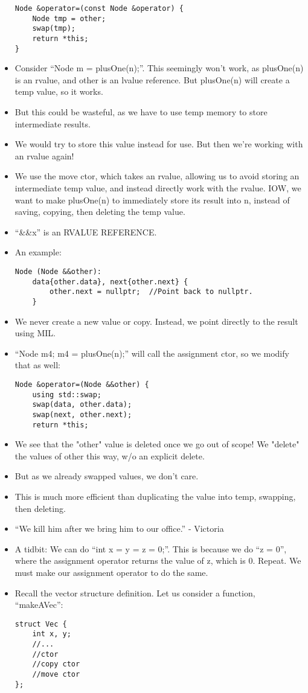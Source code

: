 \documentclass{article}
\begin{document}
\begin{itemize}
\begin{lstlisting}
Node &operator=(const Node &operator) {
    Node tmp = other;
    swap(tmp);
    return *this;
}
\end{lstlisting}
\item Consider ``Node m = plusOne(n);''.  This seemingly won't work, as plusOne(n) is an rvalue, and other is an lvalue reference.  But plusOne(n) will create a temp value, so it works.
\item But this could be wasteful, as we have to use temp memory to store intermediate results.
\item We would try to store this value instead for use.  But then we're working with an rvalue again!
\item We use the move ctor, which takes an rvalue, allowing us to avoid storing an intermediate temp value, and instead directly work with the rvalue.  IOW, we want to make plusOne(n) to immediately store its result into n, instead of saving, copying, then deleting the temp value.
\item ``&&x'' is an RVALUE REFERENCE.
\item An example:
\begin{lstlisting}
Node (Node &&other):
    data{other.data}, next{other.next} {
        other.next = nullptr;  //Point back to nullptr.
    }
\end{lstlisting}
\item We never create a new value or copy.  Instead, we point directly to the result using MIL.
\item ``Node m4; m4 = plusOne(n);'' will call the assignment ctor, so we modify that as well:
\begin{lstlisting}
Node &operator=(Node &&other) {
    using std::swap;
    swap(data, other.data);
    swap(next, other.next);
    return *this;
\end{lstlisting}
\item We see that the "other" value is deleted once we go out of scope!  We "delete" the values of other this way, w/o an explicit delete.
\item But as we already swapped values, we don't care.
\item This is much more efficient than duplicating the value into temp, swapping, then deleting.  
\item ``We kill him after we bring him to our office.'' - Victoria
\item A tidbit: We can do ``int x = y = z = 0;''.  This is because we do ``z = 0'', where the assignment operator returns the value of z, which is 0.  Repeat.  We must make our assignment operator to do the same.
\item Recall the vector structure definition.  Let us consider a function, ``makeAVec'':
\begin{lstlisting}
struct Vec {
    int x, y;
    //...
    //ctor
    //copy ctor
    //move ctor
};


\end{lstlisting}
\end{itemize}
\end{document}
